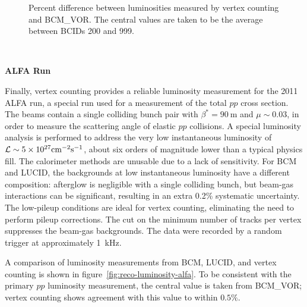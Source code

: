 \begin{figure}[h]
	\centering
	\caption{Percent difference between luminosities measured by vertex counting and BCM\_VOR. The central values are taken to be the average between BCIDs 200 and 999.}
	\label{fig:mu-scan-final}
\end{figure}

\ 

\textbf{ALFA Run}

Finally, vertex counting provides a reliable luminosity measurement for the 2011 ALFA run, a special run used for a measurement of the total $pp$ cross section. The beams contain a single colliding bunch pair with $\beta^{*}=90~\mbox{m}$ and $\mu\sim0.03$, in order to measure the scattering angle of elastic $pp$ collisions. A special luminosity analysis is performed to address the very low instantaneous luminosity of $\mathcal{L}\sim5\times 10^{27} \mathrm{cm}^{-2}\mbox{s}^{-1}$, about six orders of magnitude lower than a typical physics fill. The calorimeter methods are unusable due to a lack of sensitivity. For BCM and LUCID, the backgrounds at low instantaneous luminosity have a different composition: afterglow is negligible with a single colliding bunch, but beam-gas interactions can be significant, resulting in an extra 0.2\% systematic uncertainty. The low-pileup conditions are ideal for vertex counting, eliminating the need to perform pileup corrections. The cut on the minimum number of tracks per vertex suppresses the beam-gas backgrounds. The data were recorded by a random trigger at approximately 1~kHz. 

A comparison of luminosity measurements from BCM, LUCID, and vertex counting is shown in figure~\ref{fig:reco-luminosity-alfa}. To be consistent with the primary $pp$ luminosity measurement, the central value is taken from BCM\_VOR; vertex counting shows agreement with this value to within $0.5\%$.

